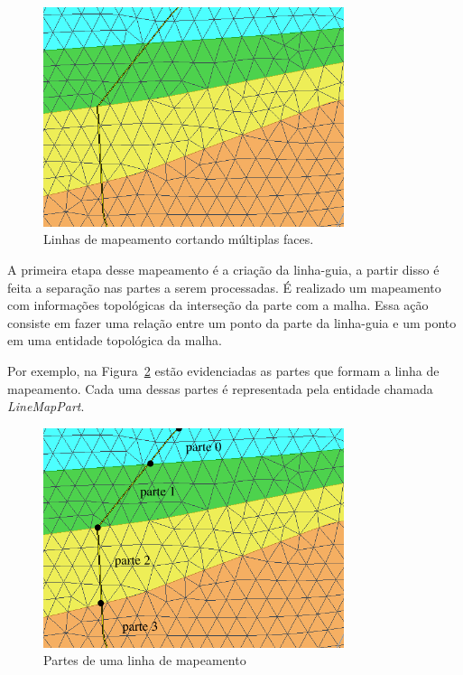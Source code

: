 \begin{figure} [h]
  \begin{center}
    \includegraphics[width=250pt]{images/fig-linhas-de-mapeamento-malhas}
    \caption{Linhas de mapeamento cortando múltiplas faces.}\label{fig-linemap-malhas}
  \end{center}
\end{figure}

A primeira etapa desse mapeamento é a criação da linha-guia, a partir disso é feita a separação nas partes a serem processadas. É realizado um mapeamento com informações topológicas da interseção da parte com a malha. Essa ação consiste em fazer uma relação entre um ponto da parte da linha-guia e um ponto em uma entidade topológica da malha.

Por exemplo, na Figura~\ref{fig-linemap-parts} estão evidenciadas as partes que formam a linha de mapeamento. Cada uma dessas partes é representada pela entidade chamada \textit{LineMapPart}.

\begin{figure} [h]
  \begin{center}
    \includegraphics[width=250pt]{images/fig-lm-parts}
    \caption{Partes de uma linha de mapeamento}\label{fig-linemap-parts}
  \end{center}
\end{figure}

